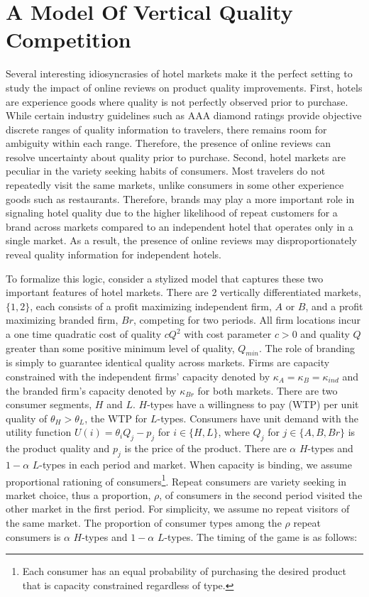 \documentclass{informs_mod} %
\begin{document}
\section{A Model Of Vertical Quality Competition} \label{sec:theory}

Several interesting idiosyncrasies of hotel markets make it the perfect setting to study the impact of online reviews on product quality improvements. First, hotels are experience goods where quality is not perfectly observed prior to purchase. While certain industry guidelines such as AAA diamond ratings provide objective discrete ranges of quality information to travelers, there remains room for ambiguity within each range. Therefore, the presence of online reviews can resolve uncertainty about quality prior to purchase. Second, hotel markets are peculiar in the variety seeking habits of consumers. Most travelers do not repeatedly visit the same markets, unlike consumers in some other experience goods such as restaurants. Therefore, brands may play a more important role in signaling hotel quality due to the higher likelihood of repeat customers for a brand across markets compared to an independent hotel that operates only in a single market. As a result, the presence of online reviews may disproportionately reveal quality information for independent hotels.

To formalize this logic, consider a  stylized model that captures these two important features of hotel markets. There are 2 vertically differentiated markets, $\{1,2\}$, each consists of a profit maximizing independent firm, $A$ or $B$, and a profit maximizing branded firm, $Br$, competing for two periods. All firm locations incur a one time quadratic cost of quality $cQ^2$ with cost parameter $c>0$ and quality $Q$ greater than some positive minimum level of quality, $Q_{min}$. The role of branding is simply to guarantee identical quality across markets. Firms are capacity constrained with the independent firms' capacity denoted by $\kappa_{A}=\kappa_B=\kappa_{ind}$ and the branded firm's capacity denoted by $\kappa_{Br}$ for both markets. There are two consumer segments, $H$ and $L$. $H$-types have a willingness to pay (WTP) per unit quality of $\theta_H>\theta_L$, the WTP for $L$-types. Consumers have unit demand with the utility function $U(i)=\theta_iQ_j-p_j$ for $i \in\{H,L\}$, where $Q_j$ for $j\in\{A,B,Br\}$ is the product quality and $p_j$ is the price of the product. There are $\alpha$ $H$-types and $1-\alpha$ $L$-types in each period and market. When capacity is binding, we assume proportional rationing of consumers\footnote{Each consumer has an equal probability of purchasing the desired product that is capacity constrained regardless of type.}. Repeat consumers are variety seeking in market choice, thus a proportion, $\rho$, of consumers in the second period visited the other market in the first period. For simplicity, we assume no repeat visitors of the same market. The proportion of consumer types among the $\rho$ repeat consumers is $\alpha$ $H$-types and $1-\alpha$ $L$-types. The timing of the game is as follows:
\end{document}
